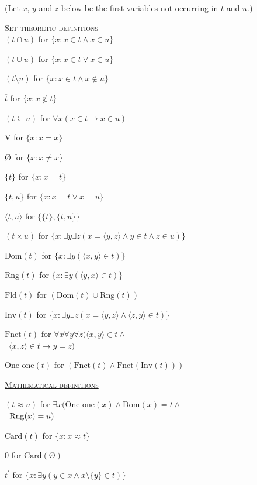 \documentclass[12pt]{report}
\theoremstyle{nonumberplain}
\begin{document}
\noindent (Let $x$, $y$ and $z$ below be the first variables not occurring in $t$ and $u$.)


\noindent\underline{\textsc{Set theoretic definitions}}\\
\noindent $(t  ∩ u)$ for $\{x : x ∈t  ∧  x ∈u\}$

\noindent $(t  ∪ u)$ for $\{x : x ∈t  ∨  x ∈u\}$

\noindent $(t \setminus u)$ for $\{x : x ∈t  ∧  x ∉ u\}$

\noindent $\overline{t}$  for $\{x : x ∉ t \}$

\noindent $(t  ⊆ u)$ for $∀x (x ∈t  →  x ∈u)$

\noindent $\mathrm{V}$ for $\{x : x = x\}$

\noindent $Ø$ for $\{x : x ≠  x\}$

\noindent $\{t \}$ for $\{x : x = t \}$

\noindent $\{t , u\}$ for $\{x : x = t  ∨  x = u\}$

\noindent $⟨t , u⟩$ for $\{\{t \}, \{t , u\}\}$

\noindent $(t  × u)$ for $\{x : ∃y ∃z(x = ⟨y, z⟩∧  y ∈t  ∧  z ∈u)\}$

\noindent $\mathrm{Dom}(t)$ for $\{x : ∃y (⟨x, y⟩∈t )\}$

\noindent $\mathrm{Rng}(t )$ for $\{x : ∃y (⟨y, x⟩∈t )\}$

\noindent $\mathrm{Fld}(t )$ for $(\mathrm{Dom}(t ) ∪ \mathrm{Rng}(t ))$

\noindent $\mathrm{Inv}(t )$ for $\{x : ∃y ∃z (x = ⟨y, z⟩∧  ⟨z, y⟩∈t )\}$

\noindent $\mathrm{Fnct}(t )$ for
 $∀x ∀y ∀z (⟨x, y⟩∈t  ∧ \phantom{p}$  \\ ~\phantom{x}\hfill$⟨x, z⟩∈t  →  y = z)$

\noindent $\text{One-one}(t)$ for $(\mathrm{Fnct}(t) ∧  \mathrm{Fnct}(\mathrm{Inv}(t )))$

\bigskip

\noindent\underline{\textsc{Mathematical definitions}}

\noindent $(t  \approx u)$ for
 $∃x (\text{One-one}(x) ∧  \mathrm{Dom}(x) = t  ∧ \phantom{x}$\\$\phantom{x} \hfill  \mathrm{Rng}(x) = u)$

\noindent $\mathrm{Card}(t )$ for $\{x : x \approx t \}$

\noindent $0$ for $\mathrm{Card}(Ø)$

\noindent $t^\prime$ for $\{x :∃y(y ∈x ∧  x \setminus \{y\} ∈t )\}$
\end{document}
